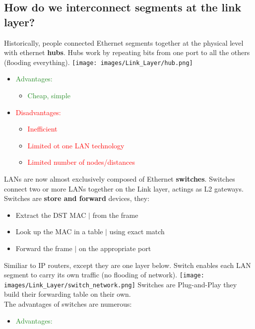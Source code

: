 \documentclass[a4paper, fontsize=8pt, landscape, DIV=1]{scrartcl}
\begin{document}
\begin{multicols*}{4}
			\subsection{How do we interconnect segments at the link layer?}
			Historically, people connected Ethernet segments together at the physical level with ethernet \textbf{hubs}. Hubs work by repeating bits from one port to all the others (flooding everything). 
			\texttt{[image: images/Link\_Layer/hub.png]}
			\begin{itemize}[noitemsep]
				\item \textcolor{ForestGreen}{Advantages:}
				\begin{itemize}
					\item \textcolor{ForestGreen}{Cheap, simple}
				\end{itemize}
				\item \textcolor{red}{Disadvantages:}
				\begin{itemize}
					\item \textcolor{red}{Inefficient}
					\item \textcolor{red}{Limited ot one LAN technology}
					\item \textcolor{red}{Limited number of nodes/distances} 
				\end{itemize} 
			\end{itemize}
   			LANs are now almost exclusively composed of Ethernet \textbf{switches}. Switches connect two or more LANs together on the Link layer, actings as L2 gateways. Switches are \textbf{store and forward} devices, they: 
   			\begin{itemize}[noitemsep]
   				\item Extract the DST MAC $\vert$ from the frame
   				\item Look up the MAC in a table $\vert$ using exact match
   				\item Forward the frame $\vert$ on the appropriate port
   			\end{itemize}
   			Similiar to IP routers, except they are one layer below. Switch enables each LAN segment to carry its own traffic (no flooding of network). 
   			\texttt{[image: images/Link\_Layer/switch\_network.png]}
   			Switches are Plug-and-Play they build their forwarding table on their own.\\
   			The advantages of switches are numerous: 
   			\begin{itemize}[noitemsep]
   				\item \textcolor{ForestGreen}{Advantages:}
   				\begin{itemize}

\end{itemize}
\end{itemize}
\end{multicols*}
\end{document}
